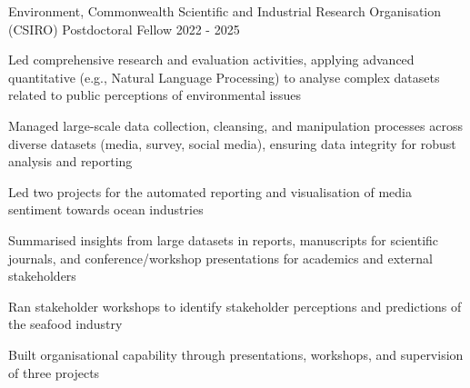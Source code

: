 


\begin{cventries}

  \cventry
    {Environment, Commonwealth Scientific and Industrial Research Organisation (CSIRO)} %
    {Postdoctoral Fellow} %
    {}%
    {2022 - 2025} %
    { %
      \begin{cvitems}
        \item Led comprehensive research and evaluation activities, applying advanced quantitative (e.g., Natural Language Processing) to analyse complex datasets related to public perceptions of environmental issues
       \item Managed large-scale data collection, cleansing, and manipulation processes across diverse datasets (media, survey, social media), ensuring data integrity for robust analysis and reporting
        \item Led two projects for the automated reporting and visualisation of media sentiment towards ocean industries
        \item Summarised insights from large datasets in reports, manuscripts for scientific journals, and conference/workshop presentations for academics and external stakeholders
        \item Ran stakeholder workshops to identify stakeholder perceptions and predictions of the seafood industry
        \item Built organisational capability through presentations, workshops, and supervision of three projects
      \end{cvitems}
    }


\end{cventries}
